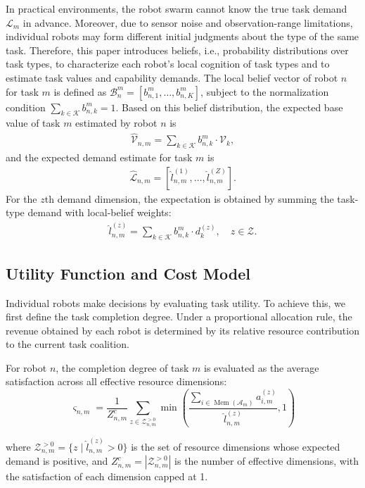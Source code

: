 \documentclass[journal,twoside,web]{ieeecolor}
\begin{document}
In practical environments, the robot swarm cannot know the true task demand $\mathcal{L}_m$ in advance. Moreover, due to sensor noise and observation-range limitations, individual robots may form different initial judgments about the type of the same task. Therefore, this paper introduces beliefs, i.e., probability distributions over task types, to characterize each robot's local cognition of task types and to estimate task values and capability demands. The local belief vector of robot $n$ for task $m$ is defined as $\mathcal{B}_{n}^m = [b_{n,1}^m, \dots, b_{n,K}^m]$, subject to the normalization condition $\sum_{k \in \mathcal{K}} b_{n,k}^m = 1$.
Based on this belief distribution, the expected base value of task $m$ estimated by robot $n$ is
\begin{align}
\widehat{\mathcal{V}}_{n,m} = \sum_{k \in \mathcal{K}} b_{n,k}^m \cdot \mathcal{V}_k,
\end{align}
and the expected demand estimate for task $m$ is
\begin{align}
\widehat{\mathcal{L}}_{n,m} = [\hat{l}_{n,m}^{(1)}, \dots, \hat{l}_{n,m}^{(Z)}].
\end{align}
For the $z$th demand dimension, the expectation is obtained by summing the task-type demand with local-belief weights:
\begin{align}
\hat{l}_{n,m}^{(z)} = \sum_{k \in \mathcal{K}} b_{n,k}^m \cdot d_k^{(z)}, \quad z \in \mathcal{Z}.
\end{align}

\subsection{Utility Function and Cost Model}
Individual robots make decisions by evaluating task utility. To achieve this, we first define the task completion degree. Under a proportional allocation rule, the revenue obtained by each robot is determined by its relative resource contribution to the current task coalition.


For robot $n$, the completion degree of task $m$ is evaluated as the average satisfaction across all effective resource dimensions:
\begin{equation}
\varsigma_{n,m} = \frac{1}{Z_{n,m}^{c}} \sum_{z \in \mathcal{Z}_{n,m}^{>0}} \min \left( \frac{\sum_{i \in \operatorname{Mem}(\mathcal{A}_m)} a_{i,m}^{(z)}}{\hat{l}_{n,m}^{(z)}}, 1 \right)
\label{eq:completion_degree}
\end{equation}

where $\mathcal{Z}_{n,m}^{>0} = \{z \mid \hat{l}_{n,m}^{(z)} > 0\}$ is the set of resource dimensions whose expected demand is positive, and $Z_{n,m}^{c} = |\mathcal{Z}_{n,m}^{>0}|$ is the number of effective dimensions, with the satisfaction of each dimension capped at 1.
\end{document}
